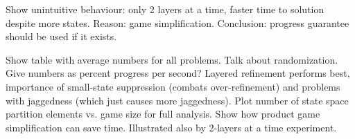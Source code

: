     Show unintuitive behaviour: only 2 layers at a time, faster time to solution despite more states.
    Reason: game simplification.
    Conclusion: progress guarantee should be used if it exists.

\stopsubsection


\startsubsection[title={Results},reference=sec:cases-integrator-results]

    Show table with average numbers for all problems.
    Talk about randomization.
    Give numbers as percent progress per second?
    Layered refinement performs best, importance of small-state suppression (combats over-refinement) and problems with jaggedness (which just causes more jaggedness).
    Plot number of state space partition elements vs. game size for full analysis.
    Show how product game simplification can save time.
    Illustrated also by 2-layers at a time experiment.

\stopsubsection

